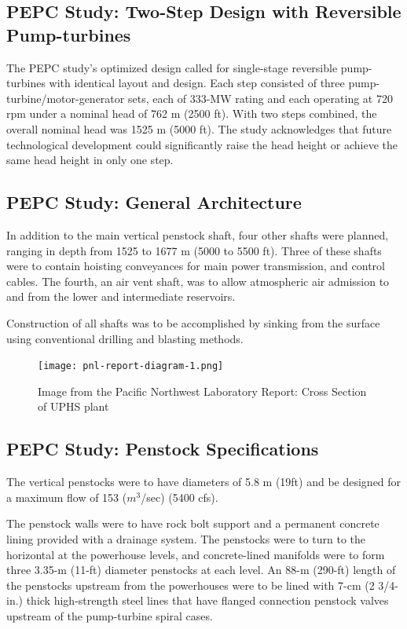 \documentclass[hidelinks,12pt,a4paper]{article}
\begin{document}
\subsection{PEPC Study: Two-Step Design with Reversible Pump-turbines}
The PEPC study's optimized design called for single-stage reversible pump-turbines with identical layout and design. Each step consisted of three pump-turbine/motor-generator sets, each of 333-MW rating and each operating at 720 rpm under a nominal head of 762 m (2500 ft). With two steps combined, the overall nominal head was 1525 m (5000 ft). The study acknowledges that future technological development could significantly raise the head height or achieve the same head height in only one step.

\subsection{PEPC Study: General Architecture}
In addition to the main vertical penstock shaft, four
other shafts were planned, ranging in depth from 1525 to 1677 m (5000
to 5500 ft). Three of these shafts were to contain hoisting conveyances for main power transmission, and control cables. The fourth, an air vent shaft, was to allow atmospheric air admission to and from the lower and intermediate reservoirs.

Construction of all shafts was to be accomplished by sinking from the surface using conventional drilling and blasting methods.

\begin{figure}[ht!]
    \centering
    \texttt{[image: pnl-report-diagram-1.png]}
    \caption{Image from the Pacific Northwest Laboratory Report: Cross Section of UPHS plant \cite{UndergroundPumpedHydroelectricStorage}}
\end{figure}
\FloatBarrier

\subsection{PEPC Study: Penstock Specifications}
The vertical penstocks were to have diameters of 5.8 m (19ft) and be designed for a maximum flow of 153 ($m^3$/sec) (5400 cfs).

The penstock walls were to have rock bolt support and a permanent concrete lining provided with a drainage system. The penstocks were to turn to the horizontal at the powerhouse levels, and concrete-lined manifolds were to form three 3.35-m (11-ft) diameter penstocks at each level. An 88-m (290-ft) length of the penstocks upstream from the powerhouses were to be lined with 7-cm (2 3/4-in.) thick high-strength steel lines that have flanged connection penstock valves upstream of the pump-turbine spiral cases.
\end{document}
